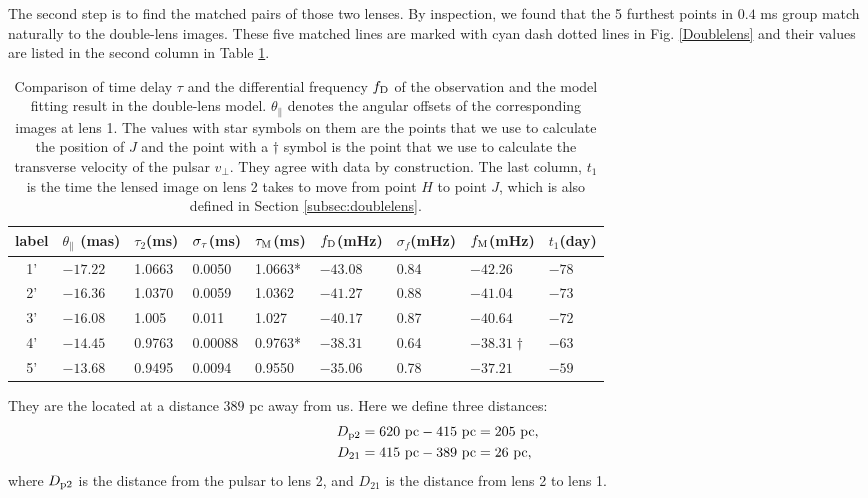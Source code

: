 \documentclass[useAMS,usenatbib]{mn2e}
\begin{document}
The second step is to find the matched pairs of those two lenses.  
By inspection, we found that the 5 furthest points in $0.4$ ms group match naturally to the double-lens images.  These five matched lines are marked with cyan dash dotted lines in Fig. \ref{Doublelens} and their values are listed in the second column in Table \ref{table:double_lens_compare}. 
\begin{table}
\centering
\begin{tabular}{c|llllllll}
\hline
label&$\theta_{\parallel}$ (mas)  & $\tau_2$(ms) & $\sigma_{\rm \tau}$(ms)  & $\tau_{\rm M}$(ms) & $f_{\rm D}$(mHz)  &$\sigma_{f}$(mHz)      &  $f_{\rm M}$(mHz)& $t_1$(day) \\ \hline
1'& $-17.22$  &  1.0663     &0.0050    & 1.0663*        & $-43.08$    &0.84   & $-42.26$           & $-78$\\
 2'& $-16.36$  &    1.0370     &0.0059    & 1.0362       & $-41.27$    & 0.88   & $-41.04$          & $-73$\\ 
3'& $-16.08$  &   1.005    &0.011   & 1.027          & $-40.17$    &   0.87     & $-40.64$          & $-72$\\ 
 4'& $-14.45$  &   0.9763    &0.00088   & 0.9763*       & $-38.31$     &0.64    & $-38.31\dagger$  & $-63$\\ 
5'& $-13.68$  &    0.9495     &0.0094    & 0.9550       & $-35.06$     &0.78    & $-37.21$          &$-59$\\ 
 \hline
\end{tabular}
\caption{Comparison of time delay $\tau$ and the differential
  frequency $f_{\rm D}$ of the observation and the model fitting result in the
  double-lens model.  $\theta_{\parallel}$ denotes the angular offsets
  of the corresponding images at lens 1. 
The values with star symbols on them are the points that we use to
calculate the position of $J$ and the point with a $\dagger$ symbol is
the point that we use to calculate the transverse velocity of the
pulsar $v_{\bot}$.  They agree with data by construction.  The last
column, $t_1$ is the time the lensed image on lens 2 takes to move
from point $H$ to point $J$, which is also defined in Section
\ref{subsec:doublelens}.} 
\label{table:double_lens_compare}
\end{table}
They are the located at a distance $389$ pc away from us. Here we define three distances:
\begin{equation}
\begin{aligned}
D_{\rm p2}&=620~{\rm pc}-415~{\rm pc} =205~{\rm pc},\\
D_{21}&=415~{\rm pc}-389~{\rm pc} =26~{\rm pc},
\end{aligned} 
\end{equation}
where $D_{\rm p2}$ is the distance from the pulsar to lens 2, and $D_{21}$ is the distance from lens 2 to lens 1.
\end{document}
